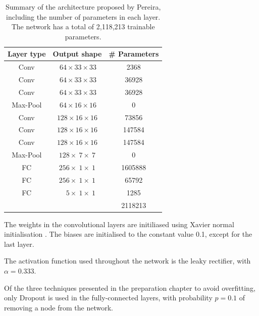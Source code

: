 \documentclass[12pt,a4paper,twoside,openright]{report}
\begin{document}
\begin{table}
\centering	
\label{table:pereira_weights}
\begin{tabular}{ c c S[table-format=7.0] } 
\textbf{Layer type} & \textbf{Output shape} & \textbf{\# Parameters} \\
 \hline
 Conv 		& $\ 64 	\times 33 	\times 33$ 	& 2368 \\ 
 Conv 		& $\ 64 	\times 33 	\times 33$ 	& 36928 \\ 
 Conv 		& $\ 64 	\times 33 	\times 33$	& 36928 \\ 
Max-Pool 	& $\ 64 	\times 16 	\times 16$ 	& 0\\
 Conv 		& $128 		 \times 16 	\times 16$	& 73856 \\ 
 Conv 		& $128 		\times 16 	\times 16$ 	& 147584 \\ 
 Conv 		& $128 		\times 16 	\times 16$ 	& 147584 \\ 
Max-Pool 	& $128 		\times\ 7 	\times\ 7$	& 0\\
FC			& $256 		\times\ 1 	\times\ 1$	& 1605888\\
FC			& $256 		\times\ 1 	\times\ 1$	& 65792\\
FC			& $\quad 5 	\times\ 1 	\times\ 1$ 	& 1285\\
\hhline{~~=}
\rule{0pt}{3ex}    
&& 2118213\\
\end{tabular}
\caption[Summary of the architecture proposed by Pereira, including the number of parameters in each layer.]{Summary of the architecture proposed by Pereira, including the number of parameters in each layer. The network has a total of 2,118,213 trainable parameters.}
\end{table}


The weights in the convolutional layers are initiliased using Xavier normal initialisation \cite{xavier_init}. The biases are initialised to the constant value 0.1, except for the last layer.

The activation function used throughout the network is the leaky rectifier, with  $\alpha = 0.333$.

Of the three techniques presented in the preparation chapter to avoid overfitting, only Dropout \cite{dropout} is used in the fully-connected layers, with probability $p=0.1$ of removing a node from the network.
\end{document}
